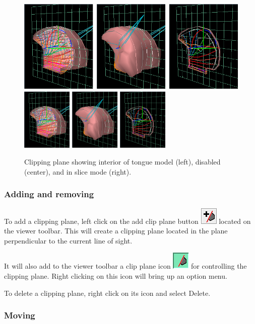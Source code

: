\documentclass{article}
\begin{document}
\begin{figure}
\begin{center}
\iflatexml
\includegraphics[]{images/clipPlane}
\else
\includegraphics[width=0.66\textwidth]{images/clipPlane}
\fi
\end{center}
\caption{Clipping plane showing interior of tongue model (left), disabled (center), and in slice mode (right).}%
\label{clipPlaneFig}
\end{figure}

\subsubsection{Adding and removing}

To add a clipping plane, left click on the {\sf add clip plane}
button \includegraphics[width=.25in]{images/addClipPlane} located on the
viewer toolbar. This will create a clipping plane located in the plane
perpendicular to the current line of sight.

It will also add to the viewer toolbar a {\sf clip plane} icon
\includegraphics[width=.25in]{images/clipPlaneIcon} for controlling the
clipping plane.  Right clicking on this icon will bring up an option
menu.

To delete a clipping plane, right click on its icon and
select {\sf Delete}.

\subsubsection{Moving}
\end{document}
